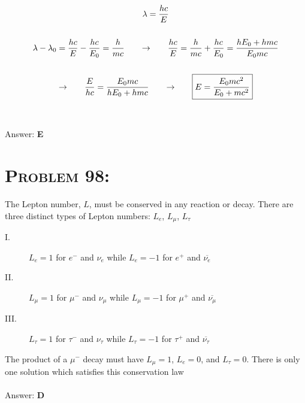 \documentclass{article}
\begin{document}
\begin{gather}
\lambda = \frac{hc}{E}\\
\nonumber\\
 \lambda - \lambda_{0} = \frac{hc}{E} - \frac{hc}{E_{0}} = \frac{h}{mc}  \hspace{.25in} \rightarrow \hspace{.25in} \frac{hc}{E} =  \frac{h}{mc} +  \frac{hc}{E_{0}} = \frac{h E_{0} + h m c}{ E_{0} m c}\nonumber\\
\nonumber\\
\rightarrow \hspace{.25in} \frac{E}{hc} = \frac{ E_{0} m c}{h E_{0} + h m c} \hspace{.25in} \rightarrow \hspace{.25in} \boxed{E = \frac{E_{0} m c^2}{E_{0} + m c^{2}}}\nonumber
\end{gather}
\\\\
Answer: \textbf{\textcolor{ProcessBlue}E}\\


\section{\textsc{Problem 98:}} The Lepton number, $L$, must be conserved in any reaction or decay. There are three distinct types of Lepton numbers: $L_{e}$, $L_{\mu}$, $L_{\tau}$

\begin{description}

\item[I.] $L_{e} = 1$  for $e^{-}$ and $\nu _{e}$ while $L_{e} = -1$  for $e^{+}$ and $\overline{\nu _{e}}$

\item[II.] $L_{\mu} = 1$  for $\mu^{-}$ and $\nu _{\mu}$ while $L_{\mu} = -1$  for $\mu^{+}$ and $\overline{\nu _{\mu}}$

\item[III.] $L_{\tau} = 1$  for $\tau^{-}$ and $\nu _{\tau}$ while $L_{\tau} = -1$  for $\tau^{+}$ and $\overline{\nu _{\tau}}$

\end{description}

\noindent
The product of a $\mu^{-}$ decay must have $L_{\mu} = 1$, $L_{e} = 0$, and $L_{\tau} = 0$. There is only one solution which satisfies this conservation law
\\\\
Answer: \textbf{\textcolor{ProcessBlue}D}\\
\end{document}
